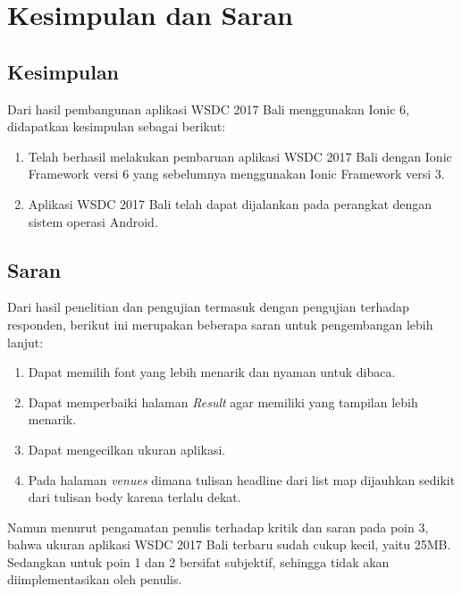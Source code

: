 \chapter{Kesimpulan dan Saran}
\label{chap:kesimpulanSaran}

\section{Kesimpulan} 
\label{sec:kesimpulan}

Dari hasil pembangunan aplikasi WSDC 2017 Bali menggunakan Ionic 6, didapatkan kesimpulan sebagai berikut:

\begin{enumerate}
	\item Telah berhasil melakukan pembaruan aplikasi WSDC 2017 Bali dengan Ionic Framework versi 6 yang sebelumnya menggunakan Ionic Framework versi 3.
	\item Aplikasi WSDC 2017 Bali telah dapat dijalankan pada perangkat dengan sistem operasi Android.
\end{enumerate}

\section{Saran} 
\label{sec:saran}

Dari hasil penelitian dan pengujian termasuk dengan pengujian terhadap responden, berikut ini merupakan beberapa saran untuk pengembangan lebih lanjut:

\begin{enumerate}
	\item Dapat memilih font yang lebih menarik dan nyaman untuk dibaca.
	\item Dapat memperbaiki halaman \textit{Result} agar memiliki yang tampilan lebih menarik.
	\item Dapat mengecilkan ukuran aplikasi.
	\item Pada halaman \textit{venues} dimana tulisan headline dari list map dijauhkan sedikit dari tulisan body karena terlalu dekat.
\end{enumerate}
	Namun menurut pengamatan penulis terhadap kritik dan saran pada poin 3, bahwa ukuran aplikasi WSDC 2017 Bali terbaru sudah cukup kecil, yaitu 25MB. Sedangkan untuk poin 1 dan 2 bersifat subjektif, sehingga tidak akan diimplementasikan oleh penulis.